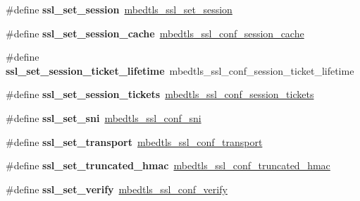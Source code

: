 \begin{DoxyCompactItemize}
\#define {\bfseries ssl\+\_\+set\+\_\+session}~\mbox{\hyperlink{ssl_8h_a91be5c606b9f7c1e44b3e507a4fe7b66}{mbedtls\+\_\+ssl\+\_\+set\+\_\+session}}
\item 
\mbox{\label{compat-1_83_8h_aa3a4fa83a3bcb6caa78a4ecadad59932}} 
\#define {\bfseries ssl\+\_\+set\+\_\+session\+\_\+cache}~\mbox{\hyperlink{ssl_8h_a9a69464288d80b3904bc7540bd52aab0}{mbedtls\+\_\+ssl\+\_\+conf\+\_\+session\+\_\+cache}}
\item 
\mbox{\label{compat-1_83_8h_ac6c83bdfdf7ac965e5949eac4bb98425}} 
\#define {\bfseries ssl\+\_\+set\+\_\+session\+\_\+ticket\+\_\+lifetime}~mbedtls\+\_\+ssl\+\_\+conf\+\_\+session\+\_\+ticket\+\_\+lifetime
\item 
\mbox{\label{compat-1_83_8h_aa46d11ad2b0ac3acb9cf8972f491d706}} 
\#define {\bfseries ssl\+\_\+set\+\_\+session\+\_\+tickets}~\mbox{\hyperlink{ssl_8h_a97e547f900979337f4083a8158918fcc}{mbedtls\+\_\+ssl\+\_\+conf\+\_\+session\+\_\+tickets}}
\item 
\mbox{\label{compat-1_83_8h_a1cb6e2fd9ac27592a397f41aace80189}} 
\#define {\bfseries ssl\+\_\+set\+\_\+sni}~\mbox{\hyperlink{ssl_8h_a38ee2c1e3f232444df5ba3952d7ded33}{mbedtls\+\_\+ssl\+\_\+conf\+\_\+sni}}
\item 
\mbox{\label{compat-1_83_8h_a71509d48537d6b5d2f28a90e59493ed5}} 
\#define {\bfseries ssl\+\_\+set\+\_\+transport}~\mbox{\hyperlink{ssl_8h_a2eb03afe9b2ca0f144a1c307100dc0ca}{mbedtls\+\_\+ssl\+\_\+conf\+\_\+transport}}
\item 
\mbox{\label{compat-1_83_8h_a9ad462fa79f9db405d84606efa9cc247}} 
\#define {\bfseries ssl\+\_\+set\+\_\+truncated\+\_\+hmac}~\mbox{\hyperlink{ssl_8h_a739b67cfc0350ae4a2c9a2e99737bea7}{mbedtls\+\_\+ssl\+\_\+conf\+\_\+truncated\+\_\+hmac}}
\item 
\mbox{\label{compat-1_83_8h_ad441632e8e7c3afb54d3404db863012f}} 
\#define {\bfseries ssl\+\_\+set\+\_\+verify}~\mbox{\hyperlink{ssl_8h_afc2b6b55d7ccaf38d84a4fbf1655f426}{mbedtls\+\_\+ssl\+\_\+conf\+\_\+verify}}
\item 
\mbox{\label{compat-1_83_8h_a167c4933ac1e8c4bddde2d0de2eb5959}} 

\end{DoxyCompactItemize}
